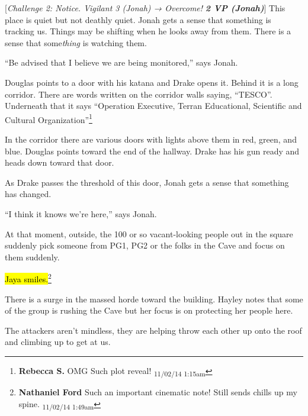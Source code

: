 {[}\textit{Challenge 2: Notice.  Vigilant 3 (Jonah) → Overcome! }\textit{\textbf{2 VP (Jonah)}}{]}  This place is quiet but not deathly quiet.  Jonah gets a sense that something is tracking us.  Things may be shifting when he looks away from them.  There is a sense that some\textit{thing} is watching them.

``Be advised that I believe we are being monitored,'' says Jonah.

Douglas points to a door with his katana and Drake opens it.  Behind it is a long corridor.  There are words written on the corridor walls saying, ``TESCO''.  Underneath that it says ``Operation Executive, Terran Educational, Scientific and Cultural Organization''\footnote{\textbf{Rebecca S. }OMG
Such plot reveal! \textsubscript{11/02/14 1:15am}}

In the corridor there are various doors with lights above them in red, green, and blue. Douglas points toward the end of the hallway.  Drake has his gun ready and heads down toward that door.

As Drake passes the threshold of this door, Jonah gets a sense that something has changed.

``I think it knows we're here,'' says Jonah.





At that moment, outside, the 100 or so vacant-looking people out in the square suddenly pick someone from PG1, PG2 or the folks in the Cave and focus on them suddenly.



\hl{Jaya smiles.}\footnote{\textbf{Nathaniel Ford }Such an important cinematic note! Still sends chills up my spine. \textsubscript{11/02/14 1:49am}}



There is a surge in the massed horde toward the building.  Hayley notes that some of the group is rushing the Cave but her focus is on protecting her people here.

The attackers aren't mindless, they are helping throw each other up onto the roof and climbing up to get at us.

